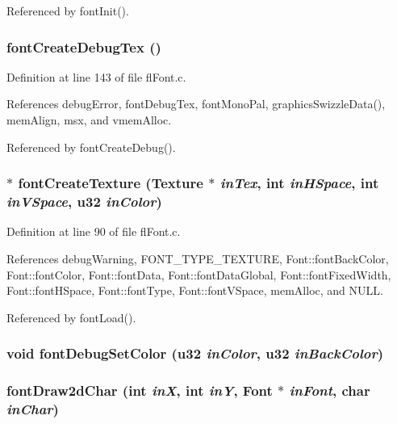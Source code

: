 Referenced by font\-Init().
\subsubsection{ font\-Create\-Debug\-Tex ()}\label{flFont_8h_86a3890982bcea3c59bdc0a52d465f98}




Definition at line 143 of file fl\-Font.c.

References debug\-Error, font\-Debug\-Tex, font\-Mono\-Pal, graphics\-Swizzle\-Data(), mem\-Align, msx, and vmem\-Alloc.

Referenced by font\-Create\-Debug().
\subsubsection{$\ast$ font\-Create\-Texture ({\bf Texture} $\ast$ {\em in\-Tex}, int {\em in\-HSpace}, int {\em in\-VSpace}, u32 {\em in\-Color})}\label{flFont_8h_3974ca441bf8e3f8af7cd80f8e4e247d}




Definition at line 90 of file fl\-Font.c.

References debug\-Warning, FONT\_\-TYPE\_\-TEXTURE, Font::font\-Back\-Color, Font::font\-Color, Font::font\-Data, Font::font\-Data\-Global, Font::font\-Fixed\-Width, Font::font\-HSpace, Font::font\-Type, Font::font\-VSpace, mem\-Alloc, and NULL.

Referenced by font\-Load().
\subsubsection{\setlength{\rightskip}{0pt plus 5cm}void font\-Debug\-Set\-Color (u32 {\em in\-Color}, u32 {\em in\-Back\-Color})}\label{flFont_8h_94327ae9b95c80af3d2dda0df24bc640}


\subsubsection{ font\-Draw2d\-Char (int {\em in\-X}, int {\em in\-Y}, {\bf Font} $\ast$ {\em in\-Font}, char {\em in\-Char})}\label{flFont_8h_bd6cbddc091774731d817cd169b35bfe}




